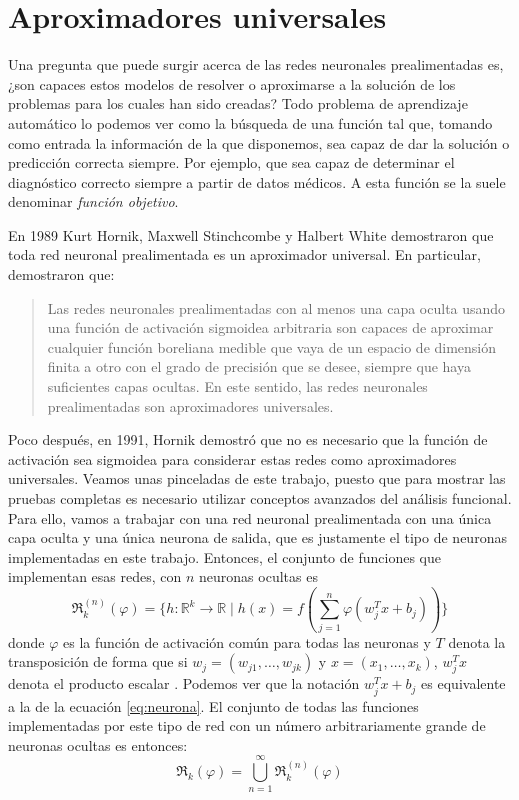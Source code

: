 \section{Aproximadores universales}

Una pregunta que puede surgir acerca de las redes neuronales prealimentadas es, ¿son capaces estos modelos de resolver
o aproximarse a la solución de los problemas para los cuales han sido creadas? Todo problema de aprendizaje automático
lo podemos ver como la búsqueda de una función tal que, tomando como entrada la información de la que disponemos, 
sea capaz de dar la solución o predicción correcta siempre. Por ejemplo, que sea capaz de determinar el diagnóstico
correcto siempre a partir de datos médicos. A esta función se la suele denominar \textit{función objetivo}. 

\vspace{10pt}
En 1989 Kurt Hornik, Maxwell Stinchcombe y Halbert White demostraron que toda red neuronal prealimentada es un 
aproximador universal. En particular, demostraron que:
\begin{quote}
    Las redes neuronales prealimentadas con al menos una capa oculta usando una función de activación sigmoidea 
    arbitraria son capaces de aproximar cualquier función boreliana medible que vaya de un espacio de dimensión finita 
    a otro con el grado de precisión que se desee, siempre que haya suficientes capas ocultas. En este sentido, las 
    redes neuronales prealimentadas son aproximadores universales. \cite{hornik_1989}
\end{quote}
Poco después, en 1991, Hornik demostró que no es necesario que la función de activación sea sigmoidea para considerar 
estas redes como aproximadores universales. Veamos unas pinceladas de este trabajo, puesto que para mostrar las 
pruebas completas es necesario utilizar conceptos avanzados del análisis funcional. Para ello, vamos a trabajar con 
una red neuronal prealimentada con una única capa oculta y una única neurona de salida, que es justamente el tipo de 
neuronas implementadas en este trabajo. Entonces, el conjunto de funciones que implementan esas redes, con $n$ neuronas 
ocultas es
\begin{equation}
    \mathfrak{R}_k^{(n)}(\varphi)=\Big\{h:\mathbb{R}^k\to\mathbb{R}\mid h(x)=f(\sum_{j=1}^n\varphi(w_j^Tx+b_j))\Big\}
\end{equation}
donde $\varphi$ es la función de activación común para todas las neuronas y $T$ denota la transposición de forma que si
$w_j=(w_{j1},\dots,w_{jk})$ y $x=(x_1,\dots,x_k)$, $w_j^Tx$ denota el producto escalar \cite{hornik_1991}. Podemos ver 
que la notación $w_j^Tx+b_j$ es equivalente a la de la ecuación \eqref{eq:neurona}. El conjunto de todas las funciones
implementadas por este tipo de red con un número arbitrariamente grande de neuronas ocultas es entonces:
\begin{equation}
    \mathfrak{R}_k(\varphi)=\bigcup_{n=1}^\infty\mathfrak{R}_k^{(n)}(\varphi)
\end{equation}

